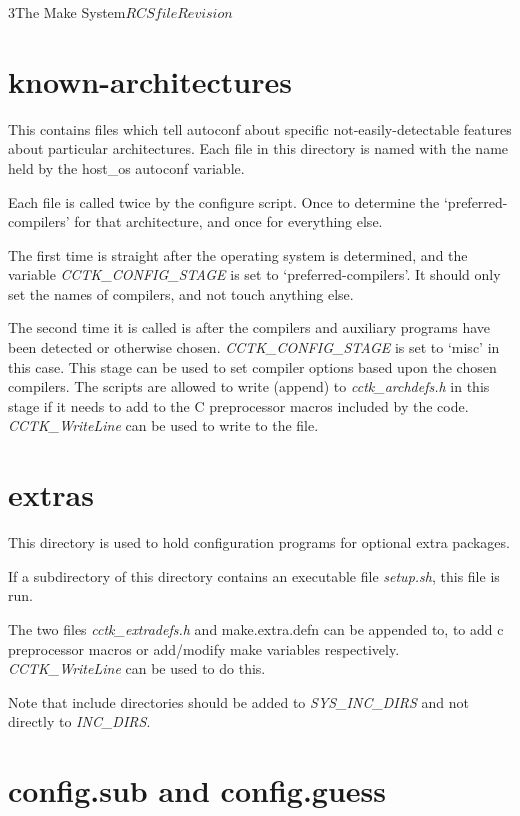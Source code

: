 \begin{cactuspart}{3}{The Make System}{$RCSfile$}{$Revision$}
\section{known-architectures}
\label{sec:autoconf:knownarch}

This contains files which tell autoconf about specific not-easily-detectable
features about particular architectures.  Each file in this directory is
named with the name held by the host\_os autoconf variable.

Each file is called twice by the configure script.  Once to determine
the `preferred-compilers' for that architecture, and once for
everything else.

The first time is straight after the operating system is 
determined, and the variable {\em CCTK\_CONFIG\_STAGE} is set to
`preferred-compilers'.  It should only set the names of compilers,
and not touch anything else.  

The second time it is called is after the compilers and
auxiliary programs have been detected or otherwise chosen. 
{\em CCTK\_CONFIG\_STAGE} is set to `misc' in this case.  This stage
can be used to set compiler options based upon the chosen compilers.
The scripts are allowed to write (append) to {\em cctk\_archdefs.h} in
this stage if it needs to add to the C preprocessor macros included
by the code.  {\em CCTK\_WriteLine} can be used to write to the
file.

\section{extras}
\label{sec:autoconf:extras}

This directory is used to hold configuration programs for optional
extra packages.

If a subdirectory of this directory contains an executable file 
{\em setup.sh}, this file is run.

The two files {\em cctk\_extradefs.h} and {make.extra.defn} can be appended
to, to add c preprocessor macros or add/modify make variables respectively.
{\em CCTK\_WriteLine} can be used to do this.  

Note that include directories should be added to {\em SYS\_INC\_DIRS} and not
directly to {\em INC\_DIRS}.

\section{config.sub and config.guess}
\label{sec:autoconf:subguess}


\end{cactuspart}
